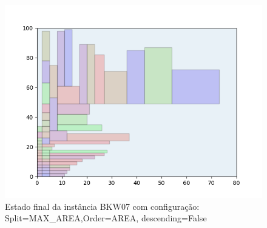 \begin{figure}[H]
    \centering
    \caption[]{Estado final da instância BKW07 com configuração: Split=MAX_AREA,Order=AREA, descending=False}
    \label{fig:bkw07-max_area-area-false}
    \includegraphics[scale=0.5]{output/figures/bkw/bkw07/max_area/area/false/00}
\end{figure}